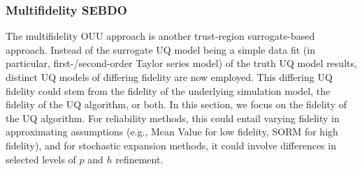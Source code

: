 \subsubsection{Multifidelity SEBDO} \label{ouu:sebdo:form:mf}

The multifidelity OUU approach is another trust-region surrogate-based
approach.  Instead of the surrogate UQ model being a simple data fit
(in particular, first-/second-order Taylor series model) of the truth
UQ model results, distinct UQ models of differing fidelity are now
employed.  This differing UQ fidelity could stem from the fidelity of
the underlying simulation model, the fidelity of the UQ algorithm, or
both.  In this section, we focus on the fidelity of the UQ algorithm.
For reliability methods, this could entail varying fidelity in
approximating assumptions (e.g., Mean Value for low fidelity, SORM for
high fidelity), and for stochastic expansion methods, it could involve
differences in selected levels of $p$ and $h$ refinement.


